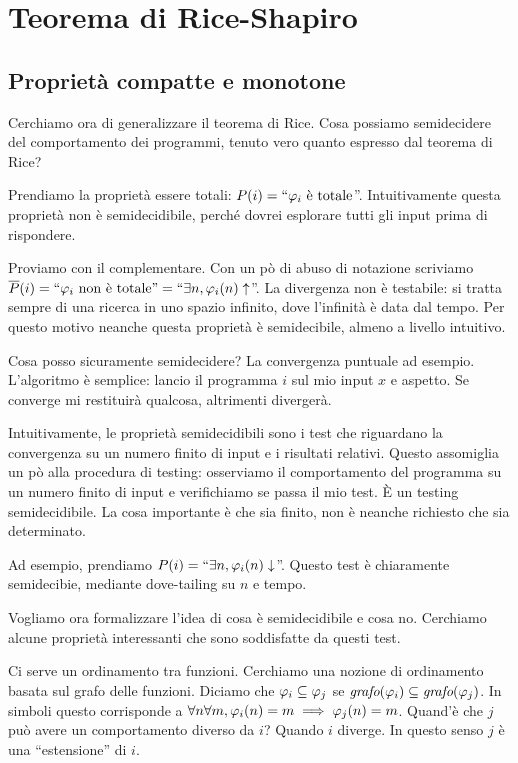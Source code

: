 \section{Teorema di Rice-Shapiro}

\subsection{Proprietà compatte e monotone}

Cerchiamo ora di generalizzare il teorema di Rice. Cosa possiamo semidecidere del comportamento dei
programmi, tenuto vero quanto espresso dal teorema di Rice?

Prendiamo la proprietà essere totali: $P(i) = ``\varphi_{i} \text{ è totale}$''. Intuitivamente questa proprietà non
è semidecidibile, perché dovrei esplorare tutti gli input prima di rispondere.

Proviamo con il complementare. Con un pò di abuso di notazione scriviamo $\overline{P}(i) = ``\varphi_{i}
\text{ non è totale''} = ``\exists n, \varphi_{i}(n) \uparrow$''. La divergenza non è testabile: si tratta
sempre di una ricerca in uno spazio infinito, dove l'infinità è data dal tempo. Per questo motivo
neanche questa proprietà è semidecibile, almeno a livello intuitivo.

Cosa posso sicuramente semidecidere? La convergenza puntuale ad esempio. L'algoritmo è semplice:
lancio il programma $i$ sul mio input $x$ e aspetto. Se converge mi restituirà qualcosa, altrimenti
divergerà.

Intuitivamente, le proprietà semidecidibili sono i test che riguardano la convergenza su un numero
finito di input e i risultati relativi. Questo assomiglia un pò alla procedura di testing:
osserviamo il comportamento del programma su un numero finito di input e verifichiamo se passa il
mio test. È un testing semidecidibile. La cosa importante è che sia finito, non è neanche
richiesto che sia determinato.

Ad esempio, prendiamo $P(i) = ``\exists n, \varphi_{i}(n) \downarrow$''. Questo test è chiaramente
semidecibie, mediante dove-tailing su $n$ e tempo.

Vogliamo ora formalizzare l'idea di cosa è semidecidibile e cosa no. Cerchiamo alcune proprietà
interessanti che sono soddisfatte da questi test.

Ci serve un ordinamento tra funzioni. Cerchiamo una nozione di ordinamento basata sul grafo delle
funzioni. Diciamo che $\varphi_{i} \subseteq \varphi_{j}$ se $\textit{grafo}(\varphi_{i}) \subseteq
\textit{grafo}(\varphi_{j})$. In simboli questo corrisponde a $\forall n \forall m, \varphi_{i}(n) = m \implies
\varphi_{j}(n) = m$. Quand'è che $j$ può avere un comportamento diverso da $i$? Quando $i$ diverge. In
questo senso $j$ è una ``estensione'' di $i$.

